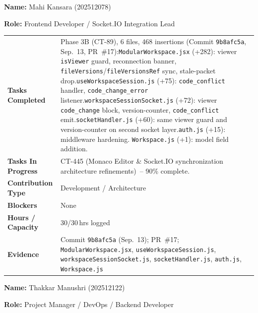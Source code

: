 \documentclass[11pt,a4paper]{article}
\newcommand{\field}[2]{\textbf{#1:} #2\par}
\begin{document}
\vspace{6pt}

\field{Name}{Mahi Kansara (202512078)}
\field{Role}{Frontend Developer / Socket.IO Integration Lead}

\vspace{4pt}

{\small
\begin{tabular}{>{\bfseries}p{} p{}}
\toprule
Tasks Completed & Phase 3B (CT-89), 6 files, 468 insertions (Commit \texttt{9b8afc5a}, Sep.\ 13, PR~\#17):\newline \texttt{ModularWorkspace.jsx} (+282): viewer \texttt{isViewer} guard, reconnection banner, \texttt{fileVersions}/\texttt{fileVersionsRef} sync, stale-packet drop.\newline \texttt{useWorkspaceSession.js} (+75): \texttt{code\_conflict} handler, \texttt{code\_change\_error} listener.\newline \texttt{workspaceSessionSocket.js} (+72): viewer \texttt{code\_change} block, version-counter, \texttt{code\_conflict} emit.\newline \texttt{socketHandler.js} (+60): same viewer guard and version-counter on second socket layer.\newline \texttt{auth.js} (+15): middleware hardening. \texttt{Workspace.js} (+1): model field addition. \\
Tasks In Progress & CT-445 (Monaco Editor \& Socket.IO synchronization architecture refinements)~-- 90\% complete. \\
Contribution Type & Development / Architecture \\
Blockers & None \\
Hours / Capacity & 30/30\,hrs logged \\
Evidence & Commit \texttt{9b8afc5a} (Sep.\ 13); PR~\#17; \texttt{ModularWorkspace.jsx}, \texttt{useWorkspaceSession.js}, \texttt{workspaceSessionSocket.js}, \texttt{socketHandler.js}, \texttt{auth.js}, \texttt{Workspace.js} \\
\bottomrule
\end{tabular}
}

\vspace{6pt}

\field{Name}{Thakkar Manushri (202512122)}
\field{Role}{Project Manager / DevOps / Backend Developer}

\vspace{4pt}
\end{document}
